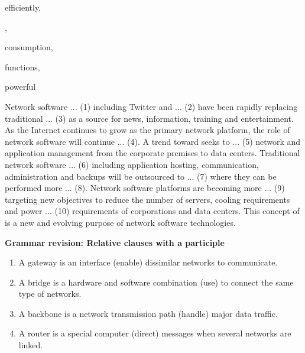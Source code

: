 \documentclass[a4paper]{article}
\begin{document}
\begin{enumerate}[label={\textbf{\Roman*.}},leftmargin=0pt,itemindent=*]
{\begin{enumerate*}[label=\alph*)]
      \item efficiently,
      \item {},
      \item consumption,
      \item functions,
      \item powerful
    \end{enumerate*}}

    \vspace{2ex}

    Network software ... (1) including Twitter and ... (2) have been rapidly
    replacing traditional ... (3) as a source for news, information, training
    and entertainment. As the Internet continues to grow as the primary network
    platform, the role of network software will continue ... (4). A trend toward
     seeks to ... (5) network and application
    management from the corporate premises to data centers. Traditional network
    software ... (6) including application hosting, communication,
    administration and backups will be outsourced to ... (7) where they can be
    performed more ... (8). Network software platforms are becoming more ... (9)
    targeting new objectives to reduce the number of servers, cooling
    requirements and power ... (10) requirements of corporations and data
    centers. This concept of  is a new and evolving purpose of
    network software technologies.

  \newpage

  \textbf{Grammar revision: Relative clauses with a participle}


    \begin{enumerate}[label=\arabic*.,itemsep=0pt]

      \item A gateway is an interface (enable) dissimilar networks to
        communicate.

      \item A bridge is a hardware and software combination (use) to connect the
        same type of networks.

      \item A backbone is a network transmission path (handle) major data
        traffic.

      \item A router is a special computer (direct) messages when several
        networks are linked.


\end{enumerate}
\end{enumerate}
\end{document}
